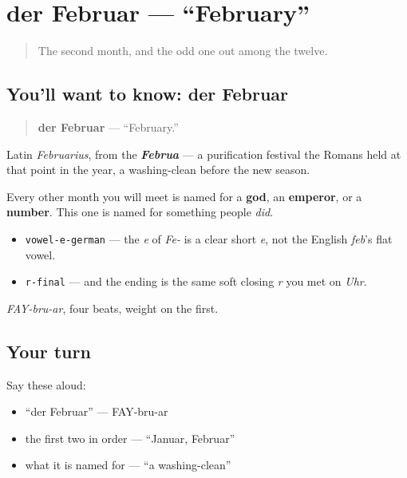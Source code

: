 \section[der Februar]{der Februar — \textquotedblleft{}February\textquotedblright{}}

\label{lesson:GE-C09-februar}



\begin{quote}
The second month, and the odd one out among the twelve.
\end{quote}

\subsection*{You'll want to know: der Februar}
\begin{quote}
\textbf{der Februar} — \textquotedblleft{}February.\textquotedblright{}
\end{quote}

Latin \emph{Februarius}, from the \emph{\textbf{Februa}} — a purification festival the Romans held at that point in the year, a washing-clean before the new season.

Every other month you will meet is named for a \textbf{god}, an \textbf{emperor}, or a \textbf{number}. This one is named for something people \emph{did}.

\begin{sounds}
\begin{itemize}
\raggedright
  \item \texttt{vowel-e-german} — the \emph{e} of \emph{Fe-} is a clear short \emph{e}, not the English \emph{feb}'s flat vowel.
  \item \texttt{r-final} — and the ending is the same soft closing \emph{r} you met on \emph{Uhr}.
\end{itemize}

\emph{FAY-bru-ar}, four beats, weight on the first.
\end{sounds}

\subsection*{Your turn}
Say these aloud:

\begin{itemize}
\raggedright
  \item \textquotedblleft{}der Februar\textquotedblright{} — FAY-bru-ar
  \item the first two in order — \textquotedblleft{}Januar, Februar\textquotedblright{}
  \item what it is named for — \textquotedblleft{}a washing-clean\textquotedblright{}
\end{itemize}

